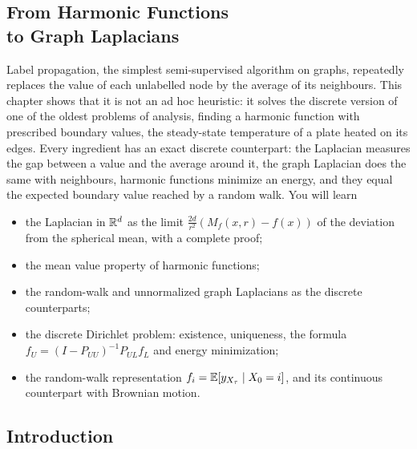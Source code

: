 \begin{notechapter}
\providecommand{\Area}{\operatorname{Area}}
\providecommand{\Vol}{\operatorname{Vol}}
\chapter[From Harmonic Functions to Graph Laplacians]{From Harmonic Functions\texorpdfstring{\\}{ } to Graph Laplacians}\label{ch:harmonic-functions}

\begin{chapterintro}
Label propagation, the simplest semi-supervised algorithm on graphs, repeatedly replaces
the value of each unlabelled node by the average of its neighbours. This chapter shows that
it is not an ad hoc heuristic: it solves the discrete version of one of the oldest problems of
analysis, finding a harmonic function with prescribed boundary values, the steady-state
temperature of a plate heated on its edges. Every ingredient has an exact discrete
counterpart: the Laplacian measures the gap between a value and the average around it, the
graph Laplacian does the same with neighbours, harmonic functions minimize an energy,
and they equal the expected boundary value reached by a random walk. You will learn
\begin{itemize}[nosep]
  \item the Laplacian in $\mathbb{R}^d$ as the limit $\frac{2d}{r^2}(M_f(x, r) - f(x))$ of the deviation from the spherical mean, with a
        complete proof;
  \item the mean value property of harmonic functions;
  \item the random-walk and unnormalized graph Laplacians as the discrete counterparts;
  \item the discrete Dirichlet problem: existence, uniqueness, the formula
        $f_U = (I - P_{UU})^{-1}P_{UL}f_L$ and energy minimization;
  \item the random-walk representation $f_i = \mathbb{E}[y_{X_\tau}\mid X_0 = i]$, and its continuous counterpart with Brownian motion.
\end{itemize}
\end{chapterintro}

\section{Introduction}


\end{notechapter}
